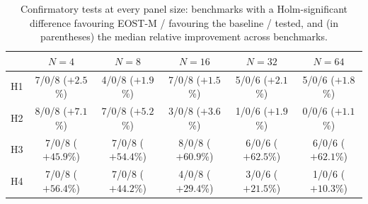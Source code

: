 \begin{table}[tbp]
\centering\footnotesize
\caption{Confirmatory tests at every panel size: benchmarks with a Holm-significant difference favouring EOST-M / favouring the baseline / tested, and (in parentheses) the median relative improvement across benchmarks.}
\label{tab:allN}
\begin{tabular}{@{}lccccc@{}}
\toprule
 & $N=4$ & $N=8$ & $N=16$ & $N=32$ & $N=64$ \\
\midrule
H1 & 7/0/8 ($+2.5$\%) & 4/0/8 ($+1.9$\%) & 7/0/8 ($+1.5$\%) & 5/0/6 ($+2.1$\%) & 5/0/6 ($+1.8$\%) \\
H2 & 8/0/8 ($+7.1$\%) & 7/0/8 ($+5.2$\%) & 3/0/8 ($+3.6$\%) & 1/0/6 ($+1.9$\%) & 0/0/6 ($+1.1$\%) \\
H3 & 7/0/8 ($+45.9$\%) & 7/0/8 ($+54.4$\%) & 8/0/8 ($+60.9$\%) & 6/0/6 ($+62.5$\%) & 6/0/6 ($+62.1$\%) \\
H4 & 7/0/8 ($+56.4$\%) & 7/0/8 ($+44.2$\%) & 4/0/8 ($+29.4$\%) & 3/0/6 ($+21.5$\%) & 1/0/6 ($+10.3$\%) \\
\bottomrule
\end{tabular}
\end{table}
